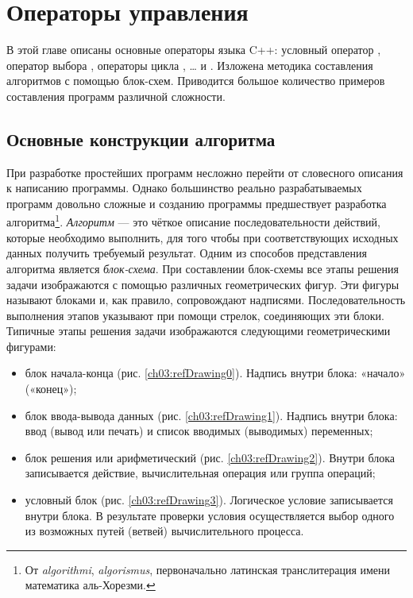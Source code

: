 \chapter[Операторы управления]{Операторы управления}

В этой главе описаны основные операторы языка C++: условный оператор , оператор выбора
, операторы цикла , … и
. Изложена методика составления алгоритмов с помощью блок-схем. Приводится большое количество
примеров составления программ различной сложности. 

\section[Основные конструкции алгоритма]{Основные конструкции алгоритма}
При разработке простейших программ несложно перейти от словесного описания к написанию программы. Однако большинство
реально разрабатываемых программ довольно сложные и созданию программы предшествует разработка алгоритма\footnote{От
\emph{algorithmi}, \emph{algorismus}, первоначально латинская транслитерация имени математика
аль-Хорезми.}. \emph{Алгоритм} --- это чёткое описание последовательности действий, которые
необходимо выполнить, для того чтобы при соответствующих исходных данных получить требуемый результат. Одним из
способов представления алгоритма является \emph{блок-схема}. При составлении блок-схемы
все этапы решения задачи изображаются с помощью различных геометрических фигур. Эти фигуры называют блоками и, как
правило, сопровождают надписями. Последовательность выполнения этапов указывают при помощи стрелок, соединяющих эти
блоки. Типичные этапы решения задачи изображаются следующими геометрическими фигурами:
\begin{itemize}
\item блок начала-конца (рис. \ref{ch03:refDrawing0}). Надпись внутри блока: «начало» («конец»);

\item блок ввода-вывода данных (рис. \ref{ch03:refDrawing1}). Надпись внутри блока: ввод (вывод или печать) и список вводимых
(выводимых) переменных;

\item блок решения или арифметический (рис. \ref{ch03:refDrawing2}). 
Внутри блока записывается действие, вычислительная операция
или группа операций;

\item условный блок (рис. \ref{ch03:refDrawing3}). Логическое условие записывается внутри блока. В результате проверки условия
осуществляется выбор одного из возможных путей (ветвей) вычислительного процесса. 
\end{itemize}
